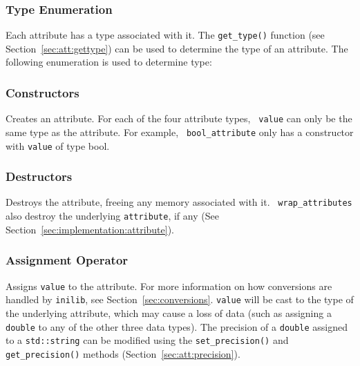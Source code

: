 \subsubsection{Type Enumeration}

Each attribute has a type associated with it.  The {\tt get\_type()}
function (see Section~\ref{sec:att:gettype}) can be used to determine
the type of an attribute.  The following enumeration is used to
determine type:

\vspace{11pt}

\subsubsection{Constructors}


Creates an attribute.  For each of the four attribute types, {\tt
value} can only be the same type as the attribute.  For example, {\tt
bool\_attribute} only has a constructor with {\tt value} of type bool.

\subsubsection{Destructors}


Destroys the attribute, freeing any memory associated with it.  {\tt
wrap\_attributes} also destroy the underlying {\tt attribute}, if any
(See Section~\ref{sec:implementation:attribute}).

\subsubsection{Assignment Operator}


Assigns {\tt value} to the attribute.  For more information on how
conversions are handled by {\tt inilib}, see
Section~\ref{sec:conversions}.  {\tt value} will be cast to the type
of the underlying attribute, which may cause a loss of data (such as
assigning a {\tt double} to any of the other three data types).  The
precision of a {\tt double} assigned to a {\tt std::string} can be
modified using the {\tt set\_precision()} and {\tt get\_precision()}
methods (Section~\ref{sec:att:precision}).

